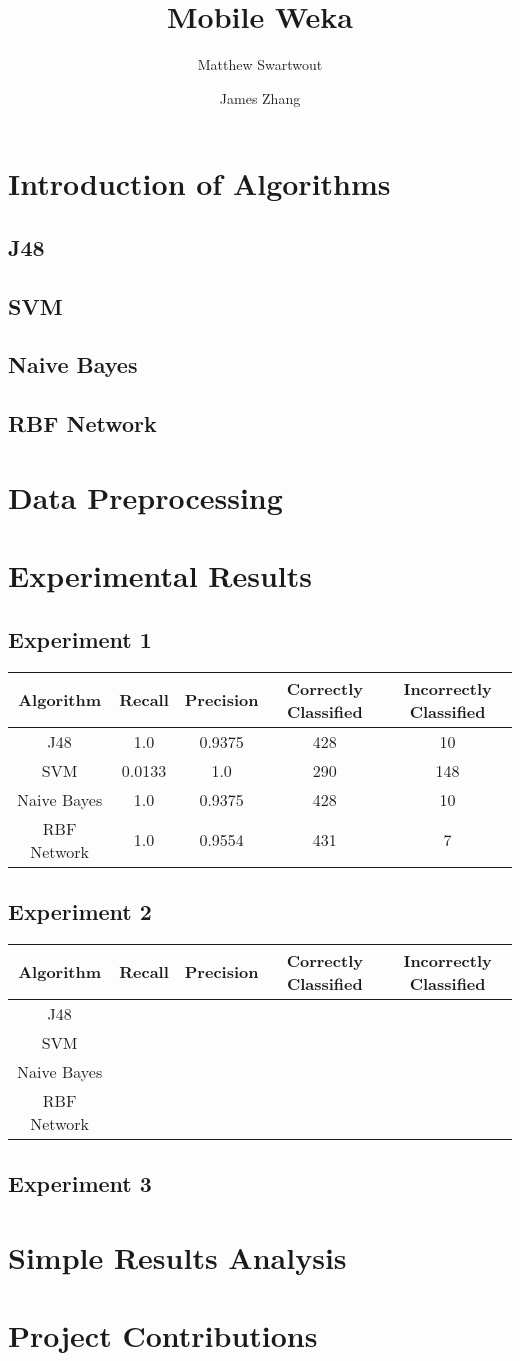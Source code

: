 \documentclass[]{article}
\title{Mobile Weka}
\author{Matthew Swartwout \and James Zhang}
\begin{document}
\maketitle

\section{Introduction of Algorithms}
\subsection{J48}
\subsection{SVM}
\subsection{Naive Bayes}
\subsection{RBF Network}

\section{Data Preprocessing}

\section{Experimental Results}
\subsection{Experiment 1}
\begin{tabular}{c | c | c| c | c}
Algorithm & Recall & Precision & Correctly Classified & Incorrectly Classified \\ \hline
J48 & 1.0 & 0.9375 & 428 & 10 \\ 
SVM & 0.0133 & 1.0 & 290 & 148 \\
Naive Bayes & 1.0 & 0.9375 &  428 & 10 \\
RBF Network & 1.0 & 0.9554 & 431 & 7 \\
\end{tabular}
\subsection{Experiment 2}
\begin{tabular}{c | c | c| c | c}
Algorithm & Recall & Precision & Correctly Classified & Incorrectly Classified \\ \hline
J48 &  &  &  &  \\ 
SVM &  &  &  &  \\
Naive Bayes & &  & &  \\
RBF Network & &  &  &  \\
\end{tabular}
\subsection{Experiment 3}

\section{Simple Results Analysis}

\section{Project Contributions}
\end{document}
